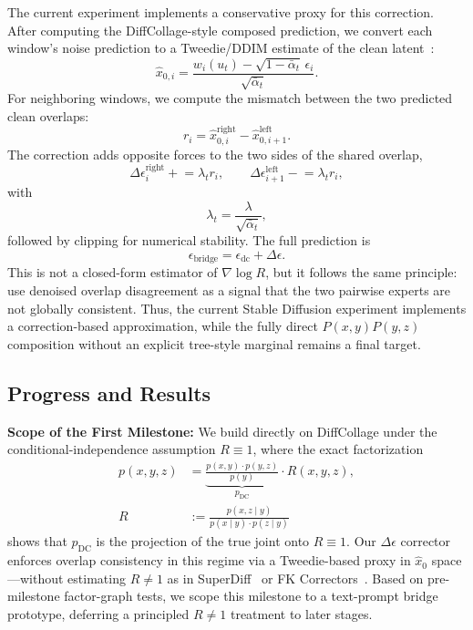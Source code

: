 \documentclass[10pt,conference,compsocconf]{IEEEtran}
\begin{document}
The current experiment implements a conservative proxy for this correction.
After computing the DiffCollage-style composed prediction, we convert each window's noise prediction to a Tweedie/DDIM estimate of the clean latent~\cite{song2022denoisingdiffusionimplicitmodels}:
\begin{equation}
\hat{x}_{0,i} = \frac{w_i(u_t)-\sqrt{1-\bar{\alpha}_t}\,\epsilon_i} {\sqrt{\bar{\alpha}_t}} .
\end{equation}
For neighboring windows, we compute the mismatch between the two predicted clean overlaps:
\begin{equation}
r_i = \hat{x}_{0,i}^{\mathrm{right}} - \hat{x}_{0,i+1}^{\mathrm{left}} .
\end{equation}
The correction adds opposite forces to the two sides of the shared overlap,
\begin{equation}
\Delta\epsilon_i^{\mathrm{right}} \mathrel{+}=
    \lambda_t r_i,\qquad
\Delta\epsilon_{i+1}^{\mathrm{left}} \mathrel{-}= \lambda_t r_i,
\end{equation}
with
\begin{equation}
\lambda_t = \frac{\lambda}{\sqrt{\bar{\alpha}_t}},
\end{equation}
followed by clipping for numerical stability.
The full prediction is
\begin{equation}
\epsilon_{\mathrm{bridge}} = \epsilon_{\mathrm{dc}} + \Delta\epsilon .
\end{equation}
This is not a closed-form estimator of $\nabla\log R$, but it follows the same principle: use denoised overlap disagreement as a signal that the two pairwise experts are not globally consistent.
Thus, the current Stable Diffusion experiment implements a correction-based approximation, while the fully direct $P(x,y)P(y,z)$ composition without an explicit tree-style marginal remains a final target.

\subsection{Progress and Results}

\textbf{Scope of the First Milestone:} We build directly on DiffCollage under the conditional-independence assumption $R \equiv 1$, where the exact factorization
\begin{align}
p(x,y,z) &= \underbrace{\frac{p(x,y)\cdot p(y,z)}{p(y)}}_{p_{\text{DC}}} \cdot R(x,y,z), \label{eq:joint-decomp} \\
R &:= \frac{p(x,z\mid y)}{p(x\mid y)\cdot p(z\mid y)}
\end{align}
shows that $p_{\text{DC}}$ is the projection of the true joint onto $R\equiv 1$. Our $\Delta\epsilon$ corrector enforces overlap consistency in this regime via a Tweedie-based proxy in $\hat{x}_0$ space---without estimating $R \neq 1$ as in SuperDiff~\cite{skreta2024superposition} or FK Correctors~\cite{skreta2025fkc}. Based on pre-milestone factor-graph tests, we scope this milestone to a text-prompt bridge prototype, deferring a principled $R \neq 1$ treatment to later stages.
\end{document}
